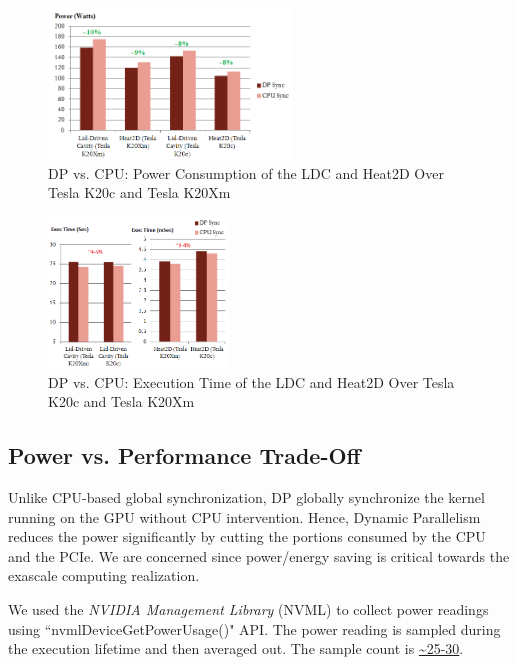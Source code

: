 \documentclass[conference]{IEEEtran}
\begin{document}
\begin{figure}
	\includegraphics[width=1.0\columnwidth, height=4cm]{Pow_readings.png}
	\caption{DP vs. CPU: Power Consumption of the LDC and Heat2D Over Tesla K20c and Tesla K20Xm}
	\label{fig:pow}
\end{figure}

\begin{figure}
	\includegraphics[width=1.0\columnwidth, height=4cm]{Perf_readings_1.png}
	\caption{DP vs. CPU: Execution Time of the LDC and Heat2D Over Tesla K20c and Tesla K20Xm}
	\label{fig:perf}
\end{figure}

\subsection{Power vs. Performance Trade-Off}

Unlike CPU-based global synchronization, DP globally synchronize the kernel running on the GPU without CPU intervention. Hence, Dynamic Parallelism reduces the power significantly by cutting the portions consumed by the CPU and the PCIe. We are concerned since power/energy saving is critical towards the exascale computing realization. 

We used the \emph{NVIDIA Management Library} (NVML) to collect power readings using ``nvmlDeviceGetPowerUsage()" API. The power reading is sampled during the execution lifetime and then averaged out. The sample count is \url{~25-30}.
\end{document}
